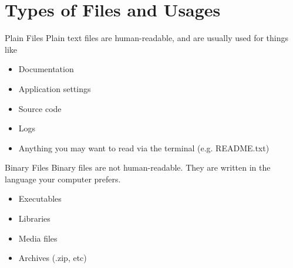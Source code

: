 \documentclass[11pt]{beamer}
\begin{document}
%

%
\section{Types of Files and Usages}
\label{sec:types_of_files}

\begin{frame}[fragile]{Plain Files}
  Plain text files are human-readable, and are usually used for things like
  \begin{itemize}[<+- | alert@+>]
    \item Documentation
    \item Application settings
    \item Source code
    \item Logs
    \item Anything you may want to read via the terminal (e.g. README.txt)
  \end{itemize}
\end{frame}

\begin{frame}[fragile]{Binary Files}
  Binary files are not human-readable.  They are written in the language your computer prefers.
  \begin{itemize}[<+- | alert@+>]
    \item Executables
    \item Libraries
    \item Media files
    \item Archives (.zip, etc)
  \end{itemize}
\end{frame}
\end{document}
